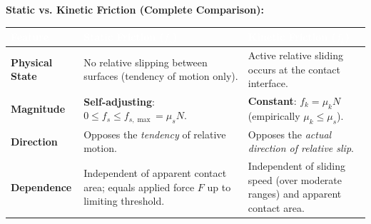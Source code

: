 \documentclass[11pt,a4paper]{article}
\begin{document}
\begin{tcolorbox}[formulacard]
  \textbf{\textcolor{primaryDark}{Static vs. Kinetic Friction (Complete Comparison):}}
  \begin{center}
  \renewcommand{\arraystretch}{1.25}
  \small
  \begin{tabularx}{\linewidth}{|>{\raggedright\arraybackslash}m{3.2cm}|>{\raggedright\arraybackslash}X|>{\raggedright\arraybackslash}X|}
  \hline
  \rowcolor{tableDarkHeader}
  \textcolor{white}{\textbf{Feature}} & \textcolor{white}{\textbf{Static Friction ($f_s$)}} & \textcolor{white}{\textbf{Kinetic Friction ($f_k$)}} \\
  \hline
  \rowcolor{white}
  \textbf{Physical State} & No relative slipping between surfaces (tendency of motion only). & Active relative sliding occurs at the contact interface. \\
  \hline
  \rowcolor{tableStripe}
  \textbf{Magnitude} & \textbf{Self-adjusting}: $0 \le f_s \le f_{s,\max} = \mu_s N$. & \textbf{Constant}: $f_k = \mu_k N$ (empirically $\mu_k \le \mu_s$). \\
  \hline
  \rowcolor{white}
  \textbf{Direction} & Opposes the \textit{tendency} of relative motion. & Opposes the \textit{actual direction of relative slip}. \\
  \hline
  \rowcolor{tableStripe}
  \textbf{Dependence} & Independent of apparent contact area; equals applied force $F$ up to limiting threshold. & Independent of sliding speed (over moderate ranges) and apparent contact area. \\
  \hline
  \end{tabularx}
  \end{center}
\end{tcolorbox}
\end{document}
